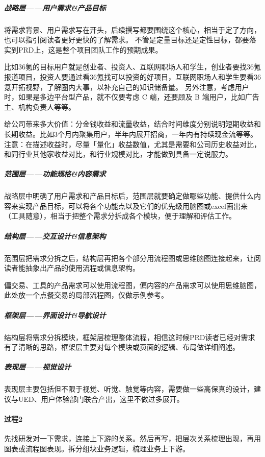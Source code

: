 \documentclass[letterpaper,11pt,english]{sphinxmanual}
\begin{document}
\subparagraph{战略层——用户需求\&产品目标}
\label{\detokenize{chapter_skill/PRD:id2}}
将需求背景、用户需求写在开头，后续撰写都要围绕这个核心，相当于定了方向，也可以指引阅读者更好更快的了解需求。
不管是定量目标还是定性目标，都要落实到PRD上，这是整个项目团队工作的预期成果。

比如36氪的目标用户就是创业者、投资人、互联网职场人和学生，创业者要找36氪报道项目，投资人要通过看36氪找可以投资的好项目，互联网职场人和学生要看36氪开拓视野，了解圈内大事，以补充自己的知识储备量。
另外注意，考虑用户时，如果是多边平台型产品，就不仅要考虑 C 端，还要顾及
B 端用户，比如广告主、机构负责人等等。

给公司带来多大价值：分金钱收益和流量收益，结合时间维度分别说明短期收益和长期收益。比如3个月内聚集用户，半年内展开招商，一年内有持续现金流等等。
注意：在描述收益时，尽量「量化」收益数值，尤其是需要和公司历史收益对比，和同行业其他家收益对比，和行业规模对比，才能做到具备一定说服力。%
\begin{footnote}[180]\sphinxAtStartFootnote
{}
%
\end{footnote}


\subparagraph{范围层——功能规格\&内容需求}
\label{\detokenize{chapter_skill/PRD:id3}}
战略层中明确了用户需求和产品目标后，范围层就要确定做哪些功能、提供什么内容来实现产品目标，可以将各个功能点以及它们的优先级用脑图或excel画出来（工具随意），相当于把整个需求分拆成各个模块，便于理解和评估工作。


\subparagraph{结构层——交互设计\&信息架构}
\label{\detokenize{chapter_skill/PRD:id4}}
范围层把需求分拆之后，结构层再把各个部分用流程图或思维脑图连接起来，让阅读者能抽象出产品的使用流程或信息架构。

偏交易、工具的产品需求可以使用流程图，偏内容的产品需求可以使用思维脑图，此处放一个点餐交易的局部流程图，仅做示例参考。


\subparagraph{框架层——界面设计\&导航设计}
\label{\detokenize{chapter_skill/PRD:id5}}
结构层将需求分拆模块，框架层梳理整体流程，相信这时候PRD读者已经对需求有了清晰的思路，框架层主要对每个模块或页面的逻辑、布局做详细阐述。


\subparagraph{表现层——视觉设计}
\label{\detokenize{chapter_skill/PRD:id6}}
表现层主要包括但不限于视觉、听觉、触觉等内容，需要做一些高保真的设计，建议与UED、用户体验部门联合产出，这里不做过多展开。


\paragraph{过程2\sphinxfootnotemark[181]}
\label{\detokenize{chapter_skill/PRD:id7}}%
\begin{footnotetext}[181]\sphinxAtStartFootnote
{}
%
\end{footnotetext}\ignorespaces 
先找研发对一下需求，连接上下游的关系。然后再写，把层次关系梳理出现，再用图表或流程图表现。拆分组块业务逻辑，梳理业务上下游。
\end{document}
